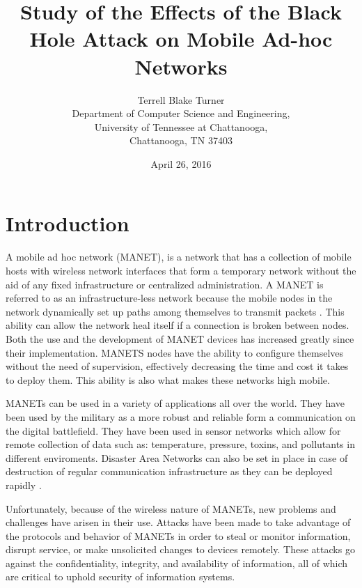 \documentclass[conference,12pt]{IEEEtran}
\date{April 26, 2016}
\begin{document}
\title{Study of the Effects of the Black Hole Attack on Mobile Ad-hoc Networks}
\vspace{-0.1in}



\author{
Terrell Blake Turner
\\
Department of Computer Science and Engineering,\\ University of Tennessee at Chattanooga,\\ Chattanooga, TN 37403
\\
}

\maketitle

\section{Introduction}
\label{intro}
A mobile ad hoc network (MANET), is a network that has a collection of mobile hosts with wireless network interfaces that form a temporary network without the aid of any fixed infrastructure or centralized administration. A MANET is referred to as an infrastructure-less network because the mobile nodes in the network dynamically set up paths among themselves to transmit packets \cite{Kale}. This ability can allow the network heal itself if a connection is broken between nodes. Both the use and the development of MANET devices has increased greatly since their implementation. MANETS nodes have the ability to configure themselves without the need of supervision, effectively decreasing the time and cost it takes to deploy them. This ability is also what makes these networks high mobile.

MANETs can be used in a variety of applications all over the world. They have been used by the military as a more robust and reliable form a communication on the digital battlefield. They have been used in sensor networks which allow for remote collection of data such as: temperature, pressure, toxins, and pollutants in different enviroments. Disaster Area Networks can also be set in place in case of destruction of regular communication infrastructure as they can be deployed rapidly \cite{Bakshi}.

Unfortunately, because of the wireless nature of MANETs, new problems and challenges have arisen in their use. Attacks have been made to take advantage of the protocols and behavior of MANETs in order to steal or monitor information, disrupt service, or make unsolicited changes to devices remotely. These attacks go against the confidentiality, integrity, and availability of information, all of which are critical to uphold security of information systems. 
\end{document}
